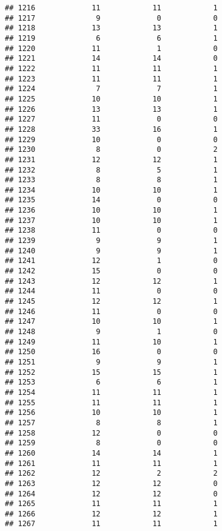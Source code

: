 \documentclass[
]{article}
\begin{document}
\begin{verbatim}
## 1216             11            11            1
## 1217              9             0            0
## 1218             13            13            1
## 1219              6             6            1
## 1220             11             1            0
## 1221             14            14            0
## 1222             11            11            1
## 1223             11            11            1
## 1224              7             7            1
## 1225             10            10            1
## 1226             13            13            1
## 1227             11             0            0
## 1228             33            16            1
## 1229             10             0            0
## 1230              8             0            2
## 1231             12            12            1
## 1232              8             5            1
## 1233              8             8            1
## 1234             10            10            1
## 1235             14             0            0
## 1236             10            10            1
## 1237             10            10            1
## 1238             11             0            0
## 1239              9             9            1
## 1240              9             9            1
## 1241             12             1            0
## 1242             15             0            0
## 1243             12            12            1
## 1244             11             0            0
## 1245             12            12            1
## 1246             11             0            0
## 1247             10            10            1
## 1248              9             1            0
## 1249             11            10            1
## 1250             16             0            0
## 1251              9             9            1
## 1252             15            15            1
## 1253              6             6            1
## 1254             11            11            1
## 1255             11            11            1
## 1256             10            10            1
## 1257              8             8            1
## 1258             12             0            0
## 1259              8             0            0
## 1260             14            14            1
## 1261             11            11            1
## 1262             12             2            2
## 1263             12            12            0
## 1264             12            12            0
## 1265             11            11            1
## 1266             12            12            1
## 1267             11            11            1

\end{verbatim}
\end{document}
